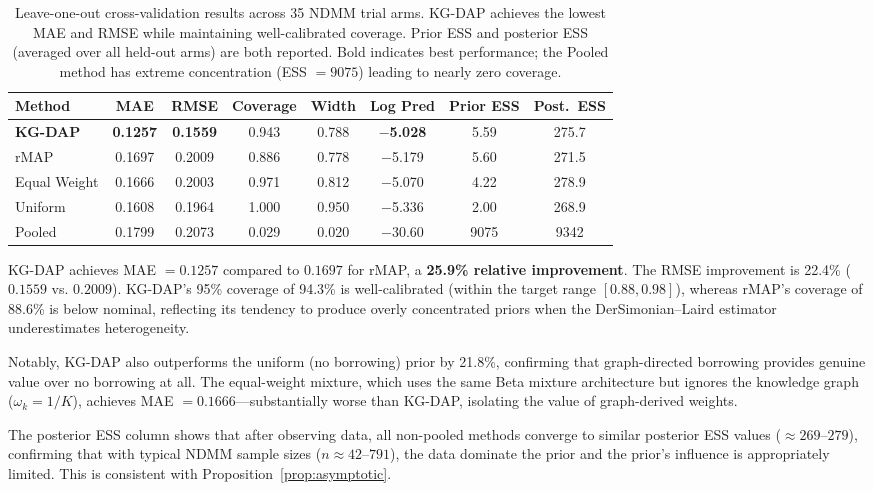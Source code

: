 \documentclass[12pt]{article}
\begin{document}
\begin{table}[t]
\centering
\caption{Leave-one-out cross-validation results across 35 NDMM trial arms. KG-DAP achieves the lowest MAE and RMSE while maintaining well-calibrated coverage. Prior ESS and posterior ESS (averaged over all held-out arms) are both reported. Bold indicates best performance; the Pooled method has extreme concentration (ESS $= 9075$) leading to nearly zero coverage.}
\label{tab:loocv}
\begin{tabular}{lccccccc}
\toprule
Method & MAE & RMSE & Coverage & Width & Log Pred & Prior ESS & Post.\ ESS \\
\midrule
\textbf{KG-DAP}   & \textbf{0.1257} & \textbf{0.1559} & 0.943 & 0.788 & \textbf{$-$5.028} & 5.59 & 275.7 \\
rMAP               & 0.1697          & 0.2009          & 0.886 & 0.778 & $-$5.179          & 5.60 & 271.5 \\
Equal Weight       & 0.1666          & 0.2003          & 0.971 & 0.812 & $-$5.070          & 4.22 & 278.9 \\
Uniform            & 0.1608          & 0.1964          & 1.000 & 0.950 & $-$5.336          & 2.00 & 268.9 \\
Pooled             & 0.1799          & 0.2073          & 0.029 & 0.020 & $-$30.60          & 9075 & 9342 \\
\bottomrule
\end{tabular}
\end{table}

KG-DAP achieves MAE $= 0.1257$ compared to $0.1697$ for rMAP, a \textbf{25.9\% relative improvement}. The RMSE improvement is 22.4\% ($0.1559$ vs. $0.2009$). KG-DAP's 95\% coverage of 94.3\% is well-calibrated (within the target range $[0.88, 0.98]$), whereas rMAP's coverage of 88.6\% is below nominal, reflecting its tendency to produce overly concentrated priors when the DerSimonian--Laird estimator underestimates heterogeneity.

Notably, KG-DAP also outperforms the uniform (no borrowing) prior by 21.8\%, confirming that graph-directed borrowing provides genuine value over no borrowing at all. The equal-weight mixture, which uses the same Beta mixture architecture but ignores the knowledge graph ($\omega_k = 1/K$), achieves MAE $= 0.1666$---substantially worse than KG-DAP, isolating the value of graph-derived weights.

The posterior ESS column shows that after observing data, all non-pooled methods converge to similar posterior ESS values ($\approx 269$--$279$), confirming that with typical NDMM sample sizes ($n \approx 42$--$791$), the data dominate the prior and the prior's influence is appropriately limited. This is consistent with Proposition~\ref{prop:asymptotic}.
\end{document}
